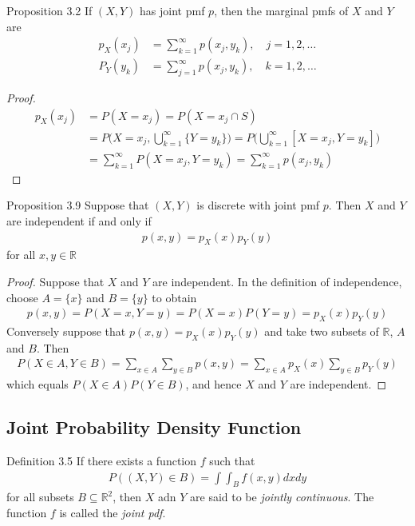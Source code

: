 \begin{boks}{Proposition 3.2}
  If $(X, Y)$ has joint pmf $p$, then the marginal pmfs of $X$ and $Y$ are
  \begin{align*}
    p_X(x_j) &= \sum_{k = 1}^\infty p(x_j, y_k), \quad j = 1, 2, \ldots \\
    P_Y(y_k) &= \sum_{j = 1}^\infty p(x_j, y_k), \quad k = 1, 2, \ldots
  \end{align*}
\end{boks}
\begin{proof}
  \begin{align*}
    p_X(x_j)  &= P(X = x_j) = P(X = x_j \cap S) \\
              &= P\bigg(X = x_j, \bigcup_{k = 1}^\infty \{Y = y_k\}\bigg) =
              P\bigg( \bigcup_{k = 1}^\infty [X = x_j, Y = y_k] \bigg) \\
              &= \sum_{k = 1}^{\infty} P(X = x_j, Y = y_k) = \sum_{k = 1}^\infty p(x_j, y_k)
  \end{align*}
\end{proof}

\begin{boks}{Proposition 3.9}
  Suppose that $(X, Y)$ is discrete with joint pmf $p$. Then $X$ and $Y$ are independent if and only if
  \begin{align*}
    p(x, y) = p_X(x)p_Y(y)
  \end{align*}
  for all $x,y \in \mathbb{R}$
\end{boks}

\begin{proof}
  Suppose that $X$ and $Y$ are independent.
  In the definition of independence, choose $A = \{x\}$ and $B = \{y\}$ to obtain
  \begin{align*}
    p(x,y) = P(X = x, Y = y) = P(X = x)P(Y = y) = p_X(x)p_Y(y)
  \end{align*}
  Conversely suppose that $p(x,y) = p_X(x)p_Y(y)$ and take two subsets of $\mathbb{R}$, $A$ and $B$.
  Then
  \begin{align*}
    P(X \in A, Y \in B) = \sum_{x \in A}\sum_{y \in B}p(x,y)
                        = \sum_{x \in A}p_X(x)\sum_{y \in B}p_Y(y)
  \end{align*}
  which equals $P(X \in A)P(Y \in B)$, and hence $X$ and $Y$ are independent.
\end{proof}

\subsection{Joint Probability Density Function}
\begin{boks}{Definition 3.5}
If there exists a function $f$ such that
\begin{align*}
    P((X, Y)\in B) = \int\int_B f(x, y) dx dy
\end{align*}
for all subsets $B\subseteq \mathbb{R}^2$, then $X$ adn $Y$ are said to be \textit{jointly continuous}. The function $f$ is called the \textit{joint pdf}.
\end{boks}


